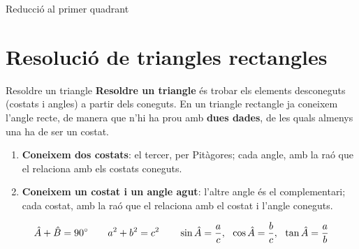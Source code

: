 \documentclass[11pt,a4paper]{article}
\makeatletter
\newcommand{\fmm}[1]{\setbox0=\hbox{$#1$}\ifdim\wd0>0.8\linewidth\def\fmmnext{\fmmdisp{#1}}\else\def\fmmnext{\mbox{\box0}}\fi\fmmnext}
\def\fmmdisp#1{\@ifnextchar.{\fmmdispp{#1}}{\@ifnextchar,{\fmmdispc{#1}}{\@ifnextchar;{\fmmdisps{#1}}{\fmdisp{#1}}}}}
\def\fmmdispp#1.{\fmdisp{#1\,.}}\def\fmmdispc#1,{\fmdisp{#1\,,}}\def\fmmdisps#1;{\fmdisp{#1\,;}}
\newcommand{\fmdisp}[1]{\[\setbox2=\hbox{$\displaystyle #1$}\ifdim\wd2>\linewidth\resizebox{\linewidth}{!}{\box2}\else\box2\fi\]}
\newcommand{\fmuline}[1]{\textbf{\color{fmaccent}#1}}
\makeatother
\begin{document}
\begin{fmprop}{Reducció al primer quadrant}
\end{fmprop}


\Needspace{5.7cm}
\section{Resolució de triangles rectangles}\hypertarget{sec5}{}
\begin{fmdef}{Resoldre un triangle}
\textbf{Resoldre un triangle} és trobar els elements desconeguts (costats i angles) a partir dels coneguts. En un triangle rectangle ja coneixem l'angle recte, de manera que n'hi ha prou amb \textbf{dues dades}, de les quals almenys una ha de ser un costat.

\begin{enumerate}
\item \textbf{Coneixem dos costats}: el tercer, per Pitàgores; cada angle, amb la raó que el relaciona amb els costats coneguts.
\item \textbf{Coneixem un costat i un angle agut}: l'altre angle és el complementari; cada costat, amb la raó que el relaciona amb el costat i l'angle coneguts.
\end{enumerate}

\fmdisp{\hat A+\hat B=90^\circ\qquad a^2+b^2=c^2\qquad \sin\hat A=\frac ac,\ \ \cos\hat A=\frac bc,\ \ \tan\hat A=\frac ab}

\end{fmdef}
\end{document}
